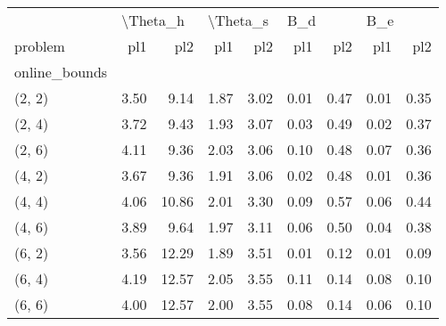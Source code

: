 \begin{tabular}{lrrrrrrrr}
\toprule
{} & \multicolumn{2}{l}{\textbackslash Theta\_h} & \multicolumn{2}{l}{\textbackslash Theta\_s} & \multicolumn{2}{l}{B\_d} & \multicolumn{2}{l}{B\_e} \\
problem &      pl1 &   pl2 &      pl1 &  pl2 &  pl1 &  pl2 &  pl1 &  pl2 \\
online\_bounds &          &       &          &      &      &      &      &      \\
\midrule
(2, 2)        &     3.50 &  9.14 &     1.87 & 3.02 & 0.01 & 0.47 & 0.01 & 0.35 \\
(2, 4)        &     3.72 &  9.43 &     1.93 & 3.07 & 0.03 & 0.49 & 0.02 & 0.37 \\
(2, 6)        &     4.11 &  9.36 &     2.03 & 3.06 & 0.10 & 0.48 & 0.07 & 0.36 \\
(4, 2)        &     3.67 &  9.36 &     1.91 & 3.06 & 0.02 & 0.48 & 0.01 & 0.36 \\
(4, 4)        &     4.06 & 10.86 &     2.01 & 3.30 & 0.09 & 0.57 & 0.06 & 0.44 \\
(4, 6)        &     3.89 &  9.64 &     1.97 & 3.11 & 0.06 & 0.50 & 0.04 & 0.38 \\
(6, 2)        &     3.56 & 12.29 &     1.89 & 3.51 & 0.01 & 0.12 & 0.01 & 0.09 \\
(6, 4)        &     4.19 & 12.57 &     2.05 & 3.55 & 0.11 & 0.14 & 0.08 & 0.10 \\
(6, 6)        &     4.00 & 12.57 &     2.00 & 3.55 & 0.08 & 0.14 & 0.06 & 0.10 \\
\bottomrule
\end{tabular}
